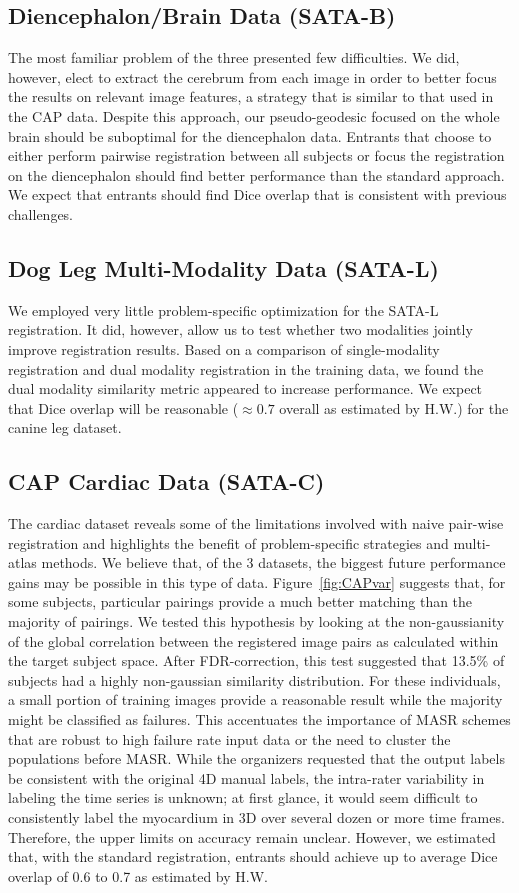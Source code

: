 \documentclass{llncs}
\begin{document}
\subsection{Diencephalon/Brain Data (SATA-B)} The most familiar
problem of the three presented few difficulties.  We did, however,
elect to extract the cerebrum from each image in order to better focus
the results on relevant image features, a strategy that is similar to
that used in the CAP data.  Despite this approach, our pseudo-geodesic
focused on the whole brain should be suboptimal for the diencephalon
data. Entrants that choose to either perform pairwise registration
between all subjects or focus the registration on the diencephalon
should find better performance than the standard approach.  We expect
that entrants should find Dice overlap that is consistent with previous challenges.

\subsection{Dog Leg Multi-Modality Data (SATA-L)}
We employed very little problem-specific optimization for the SATA-L
registration.  It did, however, allow us to test whether two
modalities jointly improve registration results.  Based on a
comparison of single-modality registration and dual modality
registration in the training data, we found the dual modality
similarity metric appeared to increase performance.  We expect that
Dice overlap will be reasonable ($\approx 0.7$ overall as estimated by
H.W.) for the canine leg dataset.

\subsection{CAP Cardiac Data (SATA-C)}
The cardiac dataset reveals some of the limitations involved with
naive pair-wise registration and highlights the benefit of
problem-specific strategies and multi-atlas methods.  We believe that,
of the 3 datasets, the biggest future performance gains may be
possible in this type of data.  Figure~\ref{fig:CAPvar} suggests that,
for some subjects, particular pairings provide a much better matching
than the majority of pairings.  We tested this hypothesis by looking
at the non-gaussianity of the global correlation between the
registered image pairs as calculated within the target subject space.
After FDR-correction, this test suggested that 13.5\% of subjects had
a highly non-gaussian similarity distribution.  For these individuals,
a small portion of training images provide a reasonable result while
the majority might be classified as failures.  This accentuates the
importance of MASR schemes that are robust to high failure rate input
data or the need to cluster the populations before MASR.  While the
organizers requested that the output labels be consistent with the
original 4D manual labels, the intra-rater variability in labeling the
time series is unknown; at first glance, it would seem difficult to
consistently label the myocardium in 3D over several dozen or more
time frames.  Therefore, the upper limits on accuracy remain unclear.
However, we estimated that, with the standard registration, entrants
should achieve up to average Dice overlap of 0.6 to 0.7 as estimated by H.W.  
\end{document}
